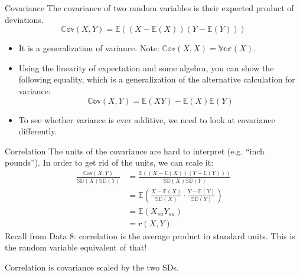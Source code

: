 \documentclass[aspectratio=169]{../latex_main/tntbeamer}  %
\begin{document}
	\begin{frame}[c]{Covariance}
	   The covariance of two random variables is their expected product of deviations.
	   \begin{equation*}
	       \mathbb{Cov}(X,Y) = \mathbb{E}((X-\mathbb{E}(X))(Y-\mathbb{E}(Y)))
	   \end{equation*}
	   \begin{itemize}
	       \item It is a generalization of variance. Note:   $\mathbb{Cov}(X,X) = \mathbb{Var}(X)$.   
	       \item Using the linearity of expectation and some algebra, you can show the following equality, which is a generalization of the alternative calculation for variance:
	       \begin{equation*}
	           \mathbb{Cov}(X,Y) = \mathbb{E}(XY) - \mathbb{E}(X)\mathbb{E}(Y)
	       \end{equation*}
	       \item To see whether variance is ever additive, we need to look at covariance differently.
	   \end{itemize}
	\end{frame}
	
	\begin{frame}[c]{Correlation}
	   The units of the covariance are hard to interpret (e.g. “inch pounds”). In order to get rid of the units, we can scale it:
	   \begin{align*}
	       \frac{\mathbb{Cov}(X,Y)}{\mathbb{SD}(X)\mathbb{SD}(Y)}  &= \frac{ \mathbb{E}((X-\mathbb{E}(X))(Y-\mathbb{E}(Y)))}{\mathbb{SD}(X)\mathbb{SD}(Y)}\\
	       &= \mathbb{E}\left( \frac{X-\mathbb{E}(X)}{\mathbb{SD}(X)} \cdot \frac{Y-\mathbb{E}(Y)}{\mathbb{SD}(Y)}\right)\\
	       &= \mathbb{E}(X_{su}Y_{su})\\
	       &= r(X,Y)
	   \end{align*}
	   Recall from Data 8: correlation is the average product in standard units. This is the random variable equivalent of that!

	   Correlation is covariance scaled by the two SDs.
	\end{frame}
\end{document}
